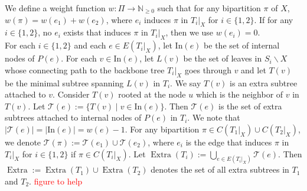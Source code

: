 \documentclass{bmcart}
\newcommand{\note}[1]{\textcolor{red}{#1}}
\newcommand{\In}{\mathrm{In}}
\DeclareMathOperator*{\extra}{Extra}
\begin{document}
We define a weight function $w:\Pi \to \mathbb{N}_{\ge 0}$ such that for any bipartition $\pi$ of $X$, $w(\pi) = w(e_1) + w(e_2)$, where $e_i$ induces $\pi$ in $T_i|_X$ for $i \in \{1,2\}$. If for any $i \in \{1,2\}$, no $e_i$ exists that induces $\pi$ in $T_i|_X$, then we use $w(e_i) = 0$.\\

For each $i \in \{1,2\}$ and each $e \in E(T_i|_X)$, let $\In(e)$ be the set of internal nodes of $P(e)$. For each $v \in \In(e)$, let $L(v)$ be the set of leaves in $S_i \backslash X$ whose connecting path to the backbone tree $T_i|_X$ goes through $v$ and let $T(v)$ be the minimal subtree spanning $L(v)$ in $T_i$. We say $T(v)$ is an extra subtree attached to $v$. Consider $T(v)$ rooted at the node $u$ which is the neighbor of $v$ in $T(v)$. Let $\mathcal{T}(e) := \{T(v) \mid v \in \In(e)\}$. Then $\mathcal{T}(e)$ is the set of extra subtrees attached to internal nodes of $P(e)$ in $T_i$. We note that $|\mathcal{T}(e)| = |\In(e)| = w(e)-1$. For any bipartition $\pi \in C(T_1|_X) \cup C(T_2|_X)$, we denote $\mathcal{T}(\pi) := \mathcal{T}(e_1) \cup \mathcal{T}(e_2)$, where $e_i$ is the edge that induces $\pi$ in $T_i|_X$ for $i \in \{1,2\}$ if $\pi \in C(T_i|_X)$. Let $\extra(T_i) := \bigcup_{e \in E(T_i|_X)} \mathcal{T}(e)$. Then $\extra := \extra(T_1) \cup \extra(T_2)$ denotes the set of all extra subtrees in $T_1$ and $T_2$. \note{figure to help}
\end{document}
